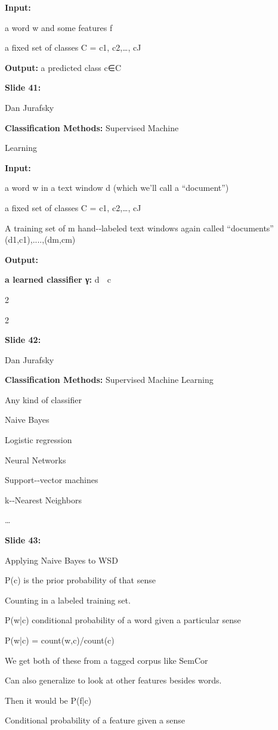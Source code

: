 \documentclass[11pt,a4paper]{article}
\begin{document}
\textbf{Input:} 

a word w and some features f

a fixed set of classes C = {c1, c2,…, cJ}

\textbf{Output:}  a predicted class c∈C

\textbf{Slide 41:}

Dan  Jurafsky

\textbf{Classification Methods:}   Supervised Machine

Learning

\textbf{Input:} 

a word w in a text window d (which we’ll call a  “document”)

a fixed set of classes	C = {c1, c2,…, cJ}

A training set of m hand-‐labeled text windows again  called	“documents” (d1,c1),....,(dm,cm)

\textbf{Output:} 

\textbf{a learned classifier γ:} d  c

2

2

\textbf{Slide 42:}

Dan  Jurafsky

\textbf{Classification Methods:}   Supervised Machine Learning

Any kind of classifier

Naive Bayes

Logistic regression

Neural Networks

Support-‐vector  machines

k-‐Nearest Neighbors

…

\textbf{Slide 43:}

Applying Naive Bayes to WSD

P(c) is the prior probability of that sense

Counting in a labeled training set.

P(w|c)	conditional probability of a word given a  particular sense

P(w|c) = count(w,c)/count(c)

We get both of these from a tagged corpus like SemCor

Can also generalize to look at other features besides  words.

Then it would be P(f|c)

Conditional probability of a feature given a sense
\end{document}
